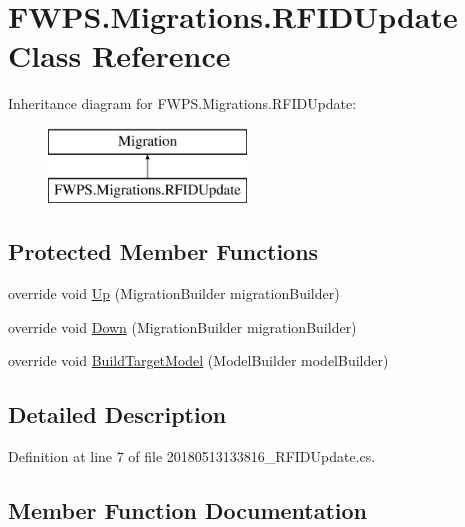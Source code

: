 \hypertarget{class_f_w_p_s_1_1_migrations_1_1_r_f_i_d_update}{}\section{F\+W\+P\+S.\+Migrations.\+R\+F\+I\+D\+Update Class Reference}
\label{class_f_w_p_s_1_1_migrations_1_1_r_f_i_d_update}
Inheritance diagram for F\+W\+P\+S.\+Migrations.\+R\+F\+I\+D\+Update\+:\begin{figure}[H]
\begin{center}
\leavevmode
\includegraphics[height=2.000000cm]{class_f_w_p_s_1_1_migrations_1_1_r_f_i_d_update}
\end{center}
\end{figure}
\subsection*{Protected Member Functions}
\begin{DoxyCompactItemize}
\item 
override void \mbox{\hyperlink{class_f_w_p_s_1_1_migrations_1_1_r_f_i_d_update_a88af5e9bb13f3ada4124bda9beac52a7}{Up}} (Migration\+Builder migration\+Builder)
\item 
override void \mbox{\hyperlink{class_f_w_p_s_1_1_migrations_1_1_r_f_i_d_update_a278e3eb7e70e976ebce009401a116d9b}{Down}} (Migration\+Builder migration\+Builder)
\item 
override void \mbox{\hyperlink{class_f_w_p_s_1_1_migrations_1_1_r_f_i_d_update_a35b8f4e992728f93b119b19cd13bbf4d}{Build\+Target\+Model}} (Model\+Builder model\+Builder)
\end{DoxyCompactItemize}


\subsection{Detailed Description}


Definition at line 7 of file 20180513133816\+\_\+\+R\+F\+I\+D\+Update.\+cs.



\subsection{Member Function Documentation}
\mbox{\label{class_f_w_p_s_1_1_migrations_1_1_r_f_i_d_update_a35b8f4e992728f93b119b19cd13bbf4d}} 
